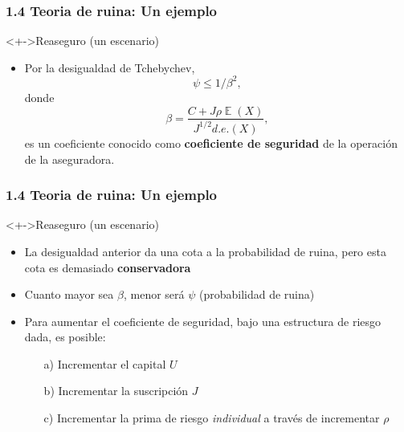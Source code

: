 \documentclass[cjk,t,compress]{beamer}
\newcommand{\field}[1]{\mathbb{#1}}
\newcommand{\expec}{\operatorname{\field{E}}}
\begin{document}
\begin{frame}[fragile]
	\frametitle{1.4 Teoria de ruina: Un ejemplo}
	\scriptsize  	
		
		\vspace{0.1cm}
		\begin{block}<+->{Reaseguro (un escenario)}
		\vspace{0.1cm}
		\begin{itemize}
		\item Por la desigualdad de Tchebychev,
		  \begin{equation}
		  \psi \leq 1/\beta^{2},
		  \nonumber
		  \end{equation}
		  donde
		  \begin{equation}
		  \beta = \frac{C+J\rho\expec(X)}{J^{1/2}d.e.(X)},
		  \nonumber
		  \end{equation}
		  es un coeficiente conocido como \textcolor{MyDarkGreen}{\bf coeficiente de seguridad} de la operaci\'on de la aseguradora.
		\end{itemize}
		\end{block}
		
\end{frame}

\begin{frame}[fragile]
	\frametitle{1.4 Teoria de ruina: Un ejemplo}
	\scriptsize  	
		
		\vspace{0.1cm}
		\begin{block}<+->{Reaseguro (un escenario)}
		\vspace{0.1cm}
		\begin{itemize}
		  \item La desigualdad anterior da una cota a la probabilidad de ruina, pero esta cota es demasiado {\bf conservadora}
		  \item Cuanto mayor sea $\beta$, menor ser\'a $\psi$ (probabilidad de ruina)
		  \item Para aumentar el coeficiente de seguridad, bajo una estructura de riesgo dada, es posible:
		  \begin{enumerate}
		  \scriptsize
		  \item[a)] Incrementar el capital $U$
		  \item[b)] Incrementar la suscripci\'on $J$
		  \item[c)] Incrementar la prima de riesgo {\it individual} a trav\'es de incrementar $\rho$
		  \end{enumerate}

		\end{itemize}
		\end{block}
		
\end{frame}
\end{document}
